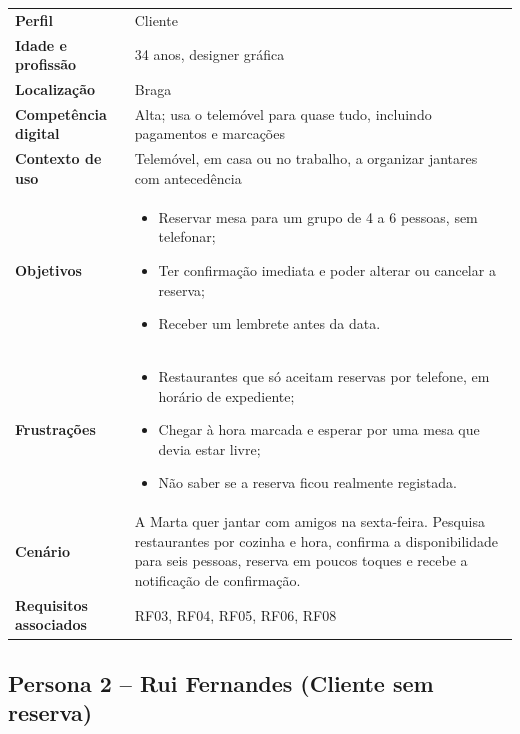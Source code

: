 \begin{tabularx}{\textwidth}{@{}>{\bfseries}p{3.4cm}X@{}}
\toprule
Perfil & Cliente \\
Idade e profissão & 34 anos, designer gráfica \\
Localização & Braga \\
Competência digital & Alta; usa o telemóvel para quase tudo, incluindo pagamentos e marcações \\
Contexto de uso & Telemóvel, em casa ou no trabalho, a organizar jantares com antecedência \\
\midrule
Objetivos &
\begin{itemize}[nosep,leftmargin=*]
  \item Reservar mesa para um grupo de 4 a 6 pessoas, sem telefonar;
  \item Ter confirmação imediata e poder alterar ou cancelar a reserva;
  \item Receber um lembrete antes da data.
\end{itemize} \\
Frustrações &
\begin{itemize}[nosep,leftmargin=*]
  \item Restaurantes que só aceitam reservas por telefone, em horário de expediente;
  \item Chegar à hora marcada e esperar por uma mesa que devia estar livre;
  \item Não saber se a reserva ficou realmente registada.
\end{itemize} \\
Cenário &
A Marta quer jantar com amigos na sexta-feira. Pesquisa restaurantes por cozinha e hora, confirma a disponibilidade para seis pessoas, reserva em poucos toques e recebe a notificação de confirmação. \\
Requisitos associados & RF03, RF04, RF05, RF06, RF08 \\
\bottomrule
\end{tabularx}
 
\subsection{Persona 2 -- Rui Fernandes (Cliente sem reserva)}
 
